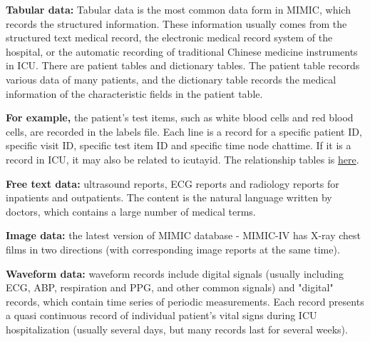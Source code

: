 \textbf{Tabular data:}
Tabular data is the most common data form in MIMIC, which records the structured information. These information usually comes from the structured text medical record, the electronic medical record system of the hospital, or the automatic recording of traditional Chinese medicine instruments in ICU. There are patient tables and dictionary tables. The patient table records various data of many patients, and the dictionary table records the medical information of the characteristic fields in the patient table. 

\textbf{For example,} the patient's test items, such as white blood cells and red blood cells, are recorded in the labels file. Each line is a record for a specific patient ID, specific visit ID, specific test item ID and specific time node chattime. If it is a record in ICU, it may also be related to icutayid. The relationship tables is \href{ https://mit-lcp.github.io/mimic-schema-spy/relationships.html }{here}. 


\textbf{Free text data:}
ultrasound reports, ECG reports and radiology reports for inpatients and outpatients. The content is the natural language written by doctors, which contains a large number of medical terms.

\textbf{Image data:}
the latest version of MIMIC database - MIMIC-IV has X-ray chest films in two directions (with corresponding image reports at the same time).

\textbf{Waveform data:}
waveform records include digital signals (usually including ECG, ABP, respiration and PPG, and other common signals) and "digital" records, which contain time series of periodic measurements. Each record presents a quasi continuous record of individual patient's vital signs during ICU hospitalization (usually several days, but many records last for several weeks).

\setcounter{tocdepth}{4}
\setcounter{secnumdepth}{4}
